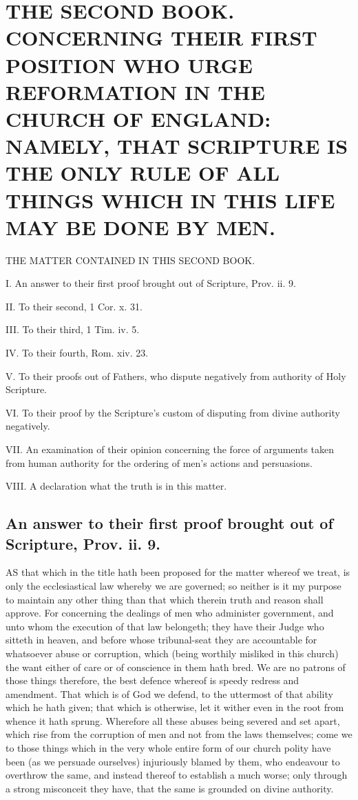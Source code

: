 \chapter*[The Second Book]{THE SECOND BOOK. 
CONCERNING THEIR FIRST POSITION WHO URGE REFORMATION IN THE CHURCH OF ENGLAND: NAMELY, THAT SCRIPTURE IS THE ONLY RULE OF ALL THINGS WHICH IN THIS LIFE MAY BE DONE BY MEN.}
\label{chap:book2}

THE MATTER CONTAINED IN THIS SECOND BOOK.

I. An answer to their first proof brought out of Scripture, Prov. ii. 9.

II. To their second, 1 Cor. x. 31.

III. To their third, 1 Tim. iv. 5.

IV. To their fourth, Rom. xiv. 23.

V. To their proofs out of Fathers, who dispute negatively from authority of Holy Scripture.

VI. To their proof by the Scripture’s custom of disputing from divine authority negatively.

VII. An examination of their opinion concerning the force of arguments taken from human authority for the ordering of men’s actions and persuasions.

VIII. A declaration what the truth is in this matter.

\PRLsep

\section*{An answer to their first proof brought out of Scripture, Prov. ii. 9.}

AS that which in the title hath been proposed for the matter whereof we treat, is only the ecclesiastical law whereby we are governed; so neither is it my purpose to maintain any other thing than that which therein truth and reason shall approve. For concerning the dealings of men who administer government, and unto whom the execution of that law belongeth; they have their Judge who sitteth in heaven, and before whose tribunal-seat they are accountable for whatsoever abuse or corruption, which (being worthily misliked in this church) the want either of care or of conscience in them hath bred. We are no patrons of those things therefore, the best defence whereof is speedy redress and amendment. That which is of God we defend, to the uttermost of that ability which he hath given; that which is otherwise, let it wither even in the root from whence it hath sprung. Wherefore all these abuses being severed and set apart,  which rise from the corruption of men and not from the laws themselves; come we to those things which in the very whole entire form of our church polity have been (as we persuade ourselves) injuriously blamed by them, who endeavour to overthrow the same, and instead thereof to establish a much worse; only through a strong misconceit they have, that the same is grounded on divine authority.

